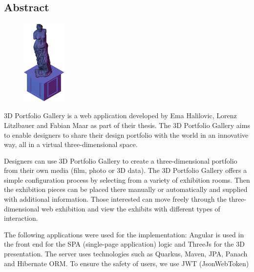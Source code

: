 \begin{spacing}{1}
    \chapter*{Abstract}
\end{spacing}
\begin{figure}
    \begin{center}
      \includegraphics[width=0.2\textwidth]{pics/statue.png}
    \end{center}
\end{figure}
3D Portfolio Gallery is a web application developed by Ema Halilovic, Lorenz Litzlbauer and Fabian Maar as part of their thesis. The 3D Portfolio Gallery aims to enable designers to share their design portfolio with the world in an innovative way, all in a virtual three-dimensional space. 

Designers can use 3D Portfolio Gallery to create a three-dimensional portfolio from their own media (film, photo or 3D data). The 3D Portfolio Gallery offers a simple configuration process by selecting from a variety of exhibition rooms. Then the exhibition pieces can be placed there manually or automatically and supplied with additional information.
Those interested can move freely through the three-dimensional web exhibition and view the exhibits with different types of interaction.

The following applications were used for the implementation: Angular is used in the front end for the SPA (single-page application) logic and ThreeJs for the 3D presentation. The server uses technologies such as Quarkus, Maven, JPA, Panach and Hibernate ORM. To ensure the safety of users, we use JWT (JsonWebToken)

